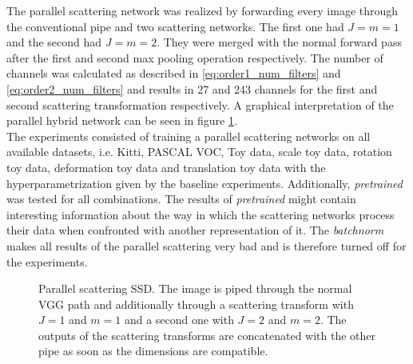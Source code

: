 The parallel scattering network was realized by forwarding every image through the conventional pipe and two scattering networks. The first one had $J=m =1$ and the second had $J=m=2$. They were merged with the normal forward pass after the first and second max pooling operation respectively. The number of channels was calculated as described in \ref{eq:order1_num_filters} and \ref{eq:order2_num_filters} and results in 27 and 243 channels for the first and second scattering transformation respectively. A graphical interpretation of the parallel hybrid network can be seen in figure \ref{fig:parallel_scattering_SSD}.  \\
The experiments consisted of training a parallel scattering networks on all available datasets, i.e. Kitti, PASCAL VOC, Toy data, scale toy data, rotation toy data, deformation toy data and translation toy data with the hyperparametrization given by the baseline experiments. Additionally, \textit{pretrained} was tested for all combinations. The results of \textit{pretrained} might contain interesting information about the way in which the scattering networks process their data when confronted with another representation of it. The \textit{batchnorm} makes all results of the parallel scattering very bad and is therefore turned off for the experiments. 

\begin{figure}[!htb]
	\centering
	\caption{Parallel scattering SSD. The image is piped through the normal VGG path and additionally through a scattering transform with $J=1$ and $m=1$ and a second one with $J=2$ and $m=2$. The outputs of the scattering transforms are concatenated with the other pipe as soon as the dimensions are compatible.}
	\label{fig:parallel_scattering_SSD}
\end{figure}

